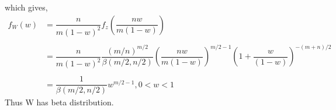 \documentclass{beamer}
\begin{document}
\begin{frame}   
   which gives,
   \begin{align}
   f_W(w)&=\dfrac{n}{m(1-w)^2}f_z(\dfrac{nw}{m(1-w)})\nonumber\\\nonumber\\
   &=\dfrac{n}{m(1-w)^2}\dfrac{(m/n)^{m/2}}{\beta(m/2,n/2)}(\dfrac{nw}{m(1-w)})^{m/2 -1}(1+\dfrac{w}{(1-w)})^{-(m+n)/2}\nonumber\\\nonumber\\
   &=\dfrac{1}{\beta(m/2,n/2)}w^{m/2 -1}, 0<w<1 \nonumber
   \end{align}
   Thus W has beta distribution.
   
\end{frame}
\end{document}
